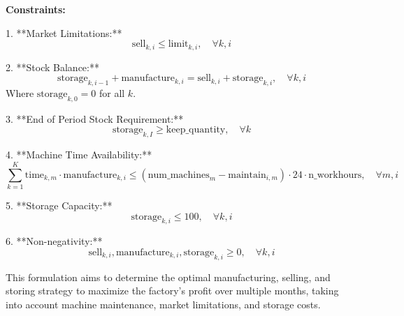 \documentclass{article}
\begin{document}
\textbf{Constraints:}

1. **Market Limitations:**
\[
\text{sell}_{k,i} \leq \text{limit}_{k,i}, \quad \forall k, i
\]

2. **Stock Balance:**
\[
\text{storage}_{k,i-1} + \text{manufacture}_{k,i} = \text{sell}_{k,i} + \text{storage}_{k,i}, \quad \forall k, i
\]
Where \(\text{storage}_{k,0} = 0\) for all \(k\).

3. **End of Period Stock Requirement:**
\[
\text{storage}_{k,I} \geq \text{keep\_quantity}, \quad \forall k
\]

4. **Machine Time Availability:**
\[
\sum_{k=1}^{K} \text{time}_{k,m} \cdot \text{manufacture}_{k,i} \leq (\text{num\_machines}_m - \text{maintain}_{i,m}) \cdot 24 \cdot \text{n\_workhours}, \quad \forall m, i
\]

5. **Storage Capacity:**
\[
\text{storage}_{k,i} \leq 100, \quad \forall k, i
\]

6. **Non-negativity:**
\[
\text{sell}_{k,i}, \text{manufacture}_{k,i}, \text{storage}_{k,i} \geq 0, \quad \forall k, i
\]

This formulation aims to determine the optimal manufacturing, selling, and storing strategy to maximize the factory's profit over multiple months, taking into account machine maintenance, market limitations, and storage costs.
\end{document}
